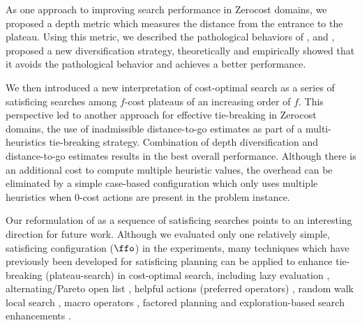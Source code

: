  As one approach to improving search performance in Zerocost domains, we proposed a depth metric
       which measures the distance from the entrance to the
       plateau. Using this metric, we described the pathological
       behaviors of \fifo, \lifo and \ro, proposed a new diversification
       strategy, theoretically and empirically showed that it avoids the
       pathological behavior and achieves a better performance.

We then introduced a new interpretation of cost-optimal \astar search as a series of satisficing
       searches among $f$-cost plateaus of an increasing order of $f$. 
This perspective led to another approach for effective tie-breaking in Zerocost domains, the use of
       inadmissible distance-to-go estimates as part of a multi-heuristics tie-breaking strategy.
       Combination of depth diversification and distance-to-go estimates results in the best overall performance. Although there is an additional cost to compute
       multiple heuristic values, the overhead can be eliminated by a simple
       case-based configuration which only uses multiple heuristics when 0-cost actions are present in the problem instance.

Our reformulation of \astar as a sequence of satisficing searches  points to  an interesting direction for future work.
Although we evaluated only one relatively simple, satisficing configuration ($\ffo$) in
the experiments, many techniques which have previously been developed for satisficing planning can be applied to enhance tie-breaking (plateau-search) in cost-optimal search, including
lazy evaluation \cite{richter2010lama}, alternating/Pareto open
list \cite{RogerH10}, helpful actions (preferred operators) \cite{Hoffmann01},
random walk local search \cite{nakhost2009monte}, macro operators
\cite{Botea2005,ChrpaVM15}, factored planning
\cite{amir2003factored,brafman2006factored,Asai2015} and
exploration-based search enhancements
\cite{valenzano2014comparison,xie14type,Valenzano2016}.

